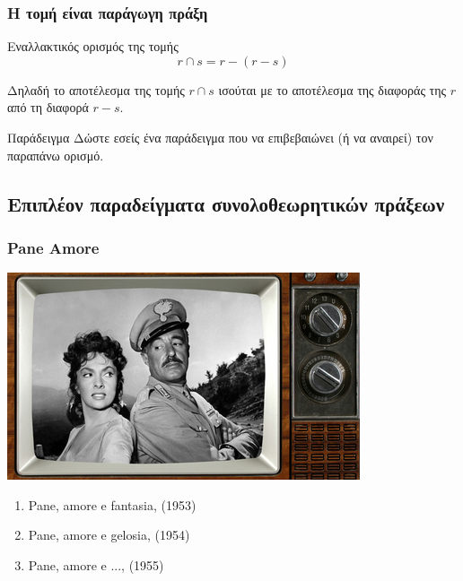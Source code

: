 \begin{frame}
\frametitle{Η τομή είναι παράγωγη πράξη}
\begin{minipage}{\wE}
  \begin{block}{Εναλλακτικός ορισμός της τομής} \Large
    \[
       r \cap s = r - (r-s)
    \]
  \end{block}
   Δηλαδή το αποτέλεσμα της τομής $r \cap s$ ισούται με το αποτέλεσμα της διαφοράς
   της $r$ από τη διαφορά $r-s$.
   \begin{exampleblock}{Παράδειγμα}
     Δώστε εσείς ένα παράδειγμα που να επιβεβαιώνει (ή να αναιρεί)
     τον παραπάνω ορισμό.
   \end{exampleblock}
\end{minipage}
\end{frame}


\subsection[{\en Examples}]{\textgreek{Επιπλέον παραδείγματα συνολοθεωρητικών πράξεων}}

\begin{frame}
\frametitle{\en Pane Amore}
\begin{minipage}{\wE}
  \includegraphics[scale=0.65]{pane-amore.jpg} \\
  \en
  \begin{enumerate}
    \item Pane, amore e fantasia, (1953)
    \item Pane, amore e gelosia, (1954)
    \item Pane, amore e ..., (1955)
  \end{enumerate}
\end{minipage}
\end{frame}

